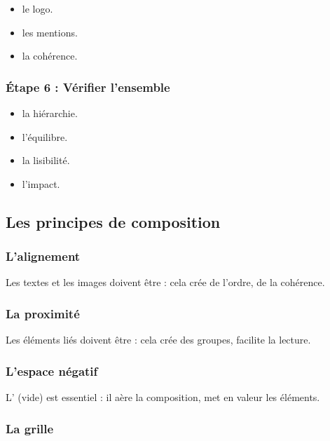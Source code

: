 \begin{itemize}
    \item {} le logo.
    \item {} les mentions.
    \item {} la cohérence.
\end{itemize}

\subsubsection{Étape 6 : Vérifier l'ensemble}

\begin{itemize}
    \item {} la hiérarchie.
    \item {} l'équilibre.
    \item {} la lisibilité.
    \item {} l'impact.
\end{itemize}

\subsection{Les principes de composition}

\subsubsection{L'alignement}

Les textes et les images doivent être  : cela crée de l'ordre, de la cohérence.

\subsubsection{La proximité}

Les éléments liés doivent être  : cela crée des groupes, facilite la lecture.

\subsubsection{L'espace négatif}

L' (vide) est essentiel : il aère la composition, met en valeur les éléments.

\subsubsection{La grille}

